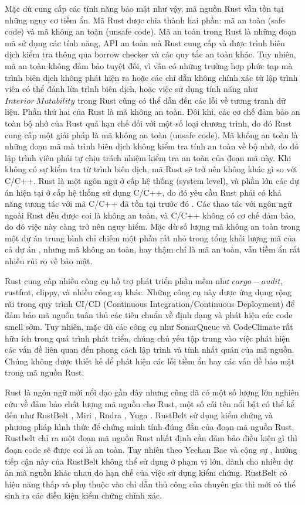 Mặc dù cung cấp các tính năng bảo mật như vậy, mã nguồn Rust vẫn tồn tại những nguy cơ tiềm ẩn.
Mã Rust được chia thành hai phần: mã an toàn (safe code) và mã không an toàn (unsafe code).
Mã an toàn trong Rust là những đoạn mã sử dụng các tính năng, API an toàn mà Rust cung cấp và được trình biên dịch kiểm tra thông qua borrow checker và các quy tắc an toàn khác.
Tuy nhiên, mã an toàn không đảm bảo tuyệt đối, vì vẫn có những trường hợp phức tạp mà trình biên dịch không phát hiện ra hoặc các chỉ dẫn không chính xác từ lập trình viên có thể đánh lừa trình biên dịch, hoặc việc sử dụng tính năng như $Interior\ Mutability$ \cite{poli2024reasoning} trong Rust cũng có thể dẫn đến các lỗi về tương tranh dữ liệu.
Phần thứ hai của Rust là mã không an toàn.
Đôi khi, các cơ chế đảm bảo an toàn bộ nhớ của Rust quá hạn chế đối với một số loại chương trình, do đó Rust cung cấp một giải pháp là mã không an toàn (unsafe code).
Mã không an toàn là những đoạn mã mà trình biên dịch không kiểm tra tính an toàn về bộ nhớ, do đó lập trình viên phải tự chịu trách nhiệm kiểm tra an toàn của đoạn mã này.
Khi không có sự kiểm tra từ trình biên dịch, mã Rust sẽ trở nên không khác gì so với C/C++.
Rust là một ngôn ngữ ở cấp hệ thống (system level), và phần lớn các dự án hiện tại ở cấp hệ thống sử dụng C/C++, do đó yêu cầu Rust phải có khả năng tương tác với mã C/C++ đã tồn tại trước đó \cite{sharma2023rust}.
Các thao tác với ngôn ngữ ngoài Rust đều được coi là không an toàn, và C/C++ không có cơ chế đảm bảo, do đó việc này càng trở nên nguy hiểm.
Mặc dù số lượng mã không an toàn trong một dự án trung bình chỉ chiếm một phần rất nhỏ trong tổng khối lượng mã của cả dự án \cite{zheng2023closer}, nhưng mã không an toàn, hay thậm chí là mã an toàn, vẫn tiềm ẩn rất nhiều rủi ro về bảo mật.

Rust cung cấp nhiều công cụ hỗ trợ phát triển phần mềm như $cargo-audit$, rustfmt, clippy, và nhiều công cụ khác.
Những công cụ này được ứng dụng rộng rãi trong quy trình CI/CD (Continuous Integration/Continuous Deployment) để đảm bảo mã nguồn tuân thủ các tiêu chuẩn về định dạng và phát hiện các code smell sớm.
Tuy nhiên, mặc dù các công cụ như SonarQueue và CodeClimate rất hữu ích trong quá trình phát triển, chúng chủ yếu tập trung vào việc phát hiện các vấn đề liên quan đến phong cách lập trình và tính nhất quán của mã nguồn.
Chúng không được thiết kế để phát hiện các lỗi tiềm ẩn hay các vấn đề bảo mật trong mã nguồn Rust.

Rust là ngôn ngữ mới nổi dạo gần đây nhưng cũng đã có một số lượng lớn nghiên cứu về đảm bảo chất lượng mã nguồn cho Rust, một số cái tên nổi bật có thể kể đến như RustBelt \cite{jung2017rustbelt}, Miri \cite{githubGitHubRustlangmiri}, Rudra \cite{bae2021rudra}, Yuga \cite{nitin2024uga}.
RustBelt sử dụng kiểm chứng và phương pháp hình thức để chứng minh tính đúng đắn của đoạn mã nguồn Rust.
Rustbelt chỉ ra một đoạn mã nguồn Rust nhất định cần đảm bảo điều kiện gì thì đoạn code sẽ được coi là an toàn.
Tuy nhiên theo Yechan Bae và cộng sự \cite{jung2017rustbelt}, hướng tiếp cận này của RustBelt không thể sử dụng ở phạm vi lớn, dành cho nhiều dự án mã nguồn khác nhau do hạn chế của việc sử dụng kiểm chứng.
RustBelt có hiệu năng thấp và phụ thuộc vào chỉ dẫn thủ công của chuyên gia thì mới có thể sinh ra các điều kiện kiểm chứng chính xác.


